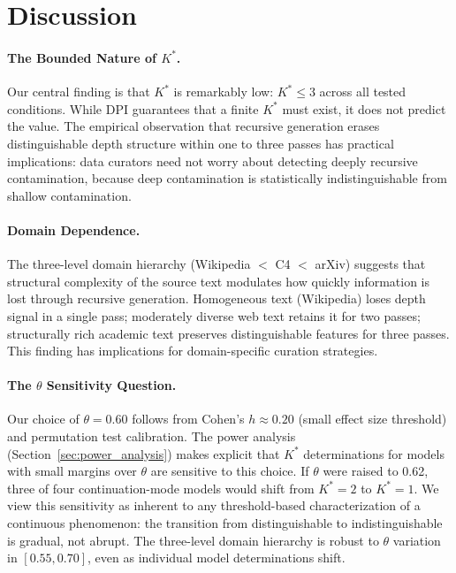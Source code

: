 \documentclass[11pt,a4paper]{article}
\begin{document}
\section{Discussion}

\paragraph{The Bounded Nature of $K^*$.}
Our central finding is that $K^*$ is remarkably low: $K^* \leq 3$ across all tested conditions. While DPI guarantees that a finite $K^*$ must exist, it does not predict the value. The empirical observation that recursive generation erases distinguishable depth structure within one to three passes has practical implications: data curators need not worry about detecting deeply recursive contamination, because deep contamination is statistically indistinguishable from shallow contamination.

\paragraph{Domain Dependence.}
The three-level domain hierarchy (Wikipedia $< $ C4 $<$ arXiv) suggests that structural complexity of the source text modulates how quickly information is lost through recursive generation. Homogeneous text (Wikipedia) loses depth signal in a single pass; moderately diverse web text retains it for two passes; structurally rich academic text preserves distinguishable features for three passes. This finding has implications for domain-specific curation strategies.

\paragraph{The $\theta$ Sensitivity Question.}
Our choice of $\theta = 0.60$ follows from Cohen's $h \approx 0.20$ (small effect size threshold) and permutation test calibration. The power analysis (Section~\ref{sec:power_analysis}) makes explicit that $K^*$ determinations for models with small margins over $\theta$ are sensitive to this choice. If $\theta$ were raised to 0.62, three of four continuation-mode models would shift from $K^*=2$ to $K^*=1$. We view this sensitivity as inherent to any threshold-based characterization of a continuous phenomenon: the transition from distinguishable to indistinguishable is gradual, not abrupt. The three-level domain hierarchy is robust to $\theta$ variation in $[0.55, 0.70]$, even as individual model determinations shift.
\end{document}
